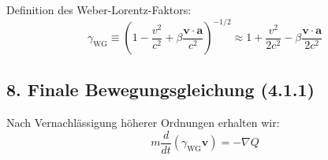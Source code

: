 Definition des Weber-Lorentz-Faktors:
\begin{equation}
\gamma_{\text{WG}} \equiv \left(1 - \frac{v^2}{c^2} + \beta\frac{\mathbf{v}\cdot\mathbf{a}}{c^2}\right)^{-1/2} \approx 1 + \frac{v^2}{2c^2} - \beta\frac{\mathbf{v}\cdot\mathbf{a}}{2c^2}
\end{equation}

\subsection*{8. Finale Bewegungsgleichung (4.1.1)}
Nach Vernachlässigung höherer Ordnungen erhalten wir:
\begin{equation}
m\frac{d}{dt}(\gamma_{\text{WG}}\mathbf{v}) = -\nabla Q
\end{equation}
